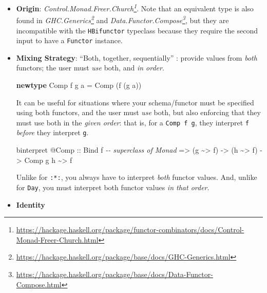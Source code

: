 \documentclass[]{article}
\newenvironment{Shaded}{}{}
\newcommand{\CommentTok}[1]{\textcolor[rgb]{0.38,0.63,0.69}{\textit{#1}}}
\newcommand{\DataTypeTok}[1]{\textcolor[rgb]{0.56,0.13,0.00}{#1}}
\newcommand{\KeywordTok}[1]{\textcolor[rgb]{0.00,0.44,0.13}{\textbf{#1}}}
\newcommand{\NormalTok}[1]{#1}
\newcommand{\OperatorTok}[1]{\textcolor[rgb]{0.40,0.40,0.40}{#1}}
\newcommand{\OtherTok}[1]{\textcolor[rgb]{0.00,0.44,0.13}{#1}}
\renewcommand{\href}[2]{#2\footnote{\url{#1}}}
\begin{document}
\begin{itemize}
\item
  \textbf{Origin}:
  \emph{\href{https://hackage.haskell.org/package/functor-combinators/docs/Control-Monad-Freer-Church.html}{Control.Monad.Freer.Church}}.
  Note that an equivalent type is also found in
  \emph{\href{https://hackage.haskell.org/package/base/docs/GHC-Generics.html}{GHC.Generics}}
  and
  \emph{\href{https://hackage.haskell.org/package/base/docs/Data-Functor-Compose.html}{Data.Functor.Compose}},
  but they are incompatible with the \texttt{HBifunctor} typeclass because they
  require the second input to have a \texttt{Functor} instance.
\item
  \textbf{Mixing Strategy}: ``Both, together, sequentially'' : provide values
  from \emph{both} functors; the user must \emph{use} both, and \emph{in order}.

\begin{Shaded}
\begin{Highlighting}[]
\KeywordTok{newtype} \DataTypeTok{Comp}\NormalTok{ f g a }\OtherTok{=} \DataTypeTok{Comp}\NormalTok{ (f (g a))}
\end{Highlighting}
\end{Shaded}

  It can be useful for situations where your schema/functor must be specified
  using both functors, and the user must \emph{use} both, but also enforcing
  that they must use both in the \emph{given order}: that is, for a
  \texttt{Comp\ f\ g}, they interpret \texttt{f} \emph{before} they interpret
  \texttt{g}.

\begin{Shaded}
\begin{Highlighting}[]
\NormalTok{binterpret }\OperatorTok{@}\DataTypeTok{Comp}
\OtherTok{    ::} \DataTypeTok{Bind}\NormalTok{ f          }\CommentTok{{-}{-} superclass of Monad}
    \OtherTok{=>}\NormalTok{ (g }\OperatorTok{\textasciitilde{}>}\NormalTok{ f)}
    \OtherTok{{-}>}\NormalTok{ (h }\OperatorTok{\textasciitilde{}>}\NormalTok{ f)}
    \OtherTok{{-}>} \DataTypeTok{Comp}\NormalTok{ g h }\OperatorTok{\textasciitilde{}>}\NormalTok{ f}
\end{Highlighting}
\end{Shaded}

  Unlike for \texttt{:*:}, you always have to interpret \emph{both} functor
  values. And, unlike for \texttt{Day}, you must interpret both functor values
  \emph{in that order}.
\item
  \textbf{Identity}


\end{itemize}
\end{document}
